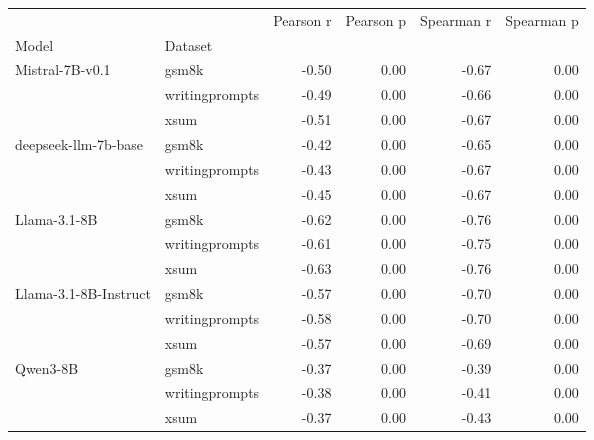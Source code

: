 \begin{tabular}{llrrrr}
\toprule
 &  & Pearson r & Pearson p & Spearman r & Spearman p \\
Model & Dataset &  &  &  &  \\
\midrule
\multirow[t]{3}{*}{Mistral-7B-v0.1} & gsm8k & -0.50 & 0.00 & -0.67 & 0.00 \\
 & writingprompts & -0.49 & 0.00 & -0.66 & 0.00 \\
 & xsum & -0.51 & 0.00 & -0.67 & 0.00 \\
\cline{1-6}
\multirow[t]{3}{*}{deepseek-llm-7b-base} & gsm8k & -0.42 & 0.00 & -0.65 & 0.00 \\
 & writingprompts & -0.43 & 0.00 & -0.67 & 0.00 \\
 & xsum & -0.45 & 0.00 & -0.67 & 0.00 \\
\cline{1-6}
\multirow[t]{3}{*}{Llama-3.1-8B} & gsm8k & -0.62 & 0.00 & -0.76 & 0.00 \\
 & writingprompts & -0.61 & 0.00 & -0.75 & 0.00 \\
 & xsum & -0.63 & 0.00 & -0.76 & 0.00 \\
\cline{1-6}
\multirow[t]{3}{*}{Llama-3.1-8B-Instruct} & gsm8k & -0.57 & 0.00 & -0.70 & 0.00 \\
 & writingprompts & -0.58 & 0.00 & -0.70 & 0.00 \\
 & xsum & -0.57 & 0.00 & -0.69 & 0.00 \\
\cline{1-6}
\multirow[t]{3}{*}{Qwen3-8B} & gsm8k & -0.37 & 0.00 & -0.39 & 0.00 \\
 & writingprompts & -0.38 & 0.00 & -0.41 & 0.00 \\
 & xsum & -0.37 & 0.00 & -0.43 & 0.00 \\
\cline{1-6}
\bottomrule
\end{tabular}
